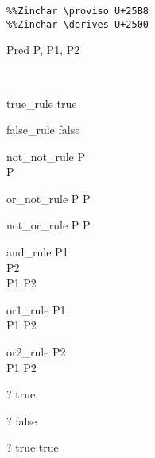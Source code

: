 \begin{verbatim}
%%Zinchar \proviso U+25B8
%%Zinchar \derives U+2500
\end{verbatim}

\begin{zedjoker}{Pred} P, P1, P2\end{zedjoker} \\

\begin{zedrule}{true_rule}
  true
\end{zedrule}

\begin{zedrule}{false_rule}
  \lnot false
\end{zedrule}

\begin{zedrule}{not_not_rule}
  P \\
\derives
  \lnot \lnot P
\end{zedrule}

\begin{zedrule}{or_not_rule}
  P \lor \lnot P
\end{zedrule}

\begin{zedrule}{not_or_rule}
  \lnot P \lor P
\end{zedrule}

\begin{zedrule}{and_rule}
  P1 \\
  P2 \\
\derives
  P1 \land P2  
\end {zedrule}

\begin{zedrule}{or1_rule}
  P1 \\
\derives
  P1 \lor P2  
\end {zedrule}

\begin{zedrule}{or2_rule}
  P2 \\
\derives
  P1 \lor P2  
\end {zedrule}

\begin{zed}
  \vdash? true
\end{zed}

\begin{zed}
  \vdash? \lnot false
\end{zed}

\begin{zed}
  \vdash? true \land true
\end{zed}

